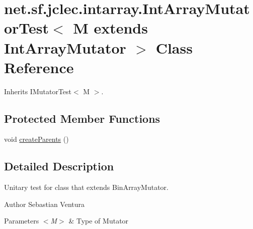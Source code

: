 \hypertarget{classnet_1_1sf_1_1jclec_1_1intarray_1_1_int_array_mutator_test_3_01_m_01extends_01_int_array_mutator_01_4}{\section{net.\-sf.\-jclec.\-intarray.\-Int\-Array\-Mutator\-Test$<$ M extends Int\-Array\-Mutator $>$ Class Reference}
\label{classnet_1_1sf_1_1jclec_1_1intarray_1_1_int_array_mutator_test_3_01_m_01extends_01_int_array_mutator_01_4}
}


Inherits I\-Mutator\-Test$<$ M $>$.

\subsection*{Protected Member Functions}
\begin{DoxyCompactItemize}
\item 
void \hyperlink{classnet_1_1sf_1_1jclec_1_1intarray_1_1_int_array_mutator_test_3_01_m_01extends_01_int_array_mutator_01_4_a6222d4e7623efc74567d8fc9cb230137}{create\-Parents} ()
\end{DoxyCompactItemize}


\subsection{Detailed Description}
Unitary test for class that extends Bin\-Array\-Mutator.

\begin{DoxyAuthor}{Author}
Sebastian Ventura
\end{DoxyAuthor}

\begin{DoxyParams}{Parameters}
{\em $<$\-M$>$} & Type of Mutator \\
\hline
\end{DoxyParams}


